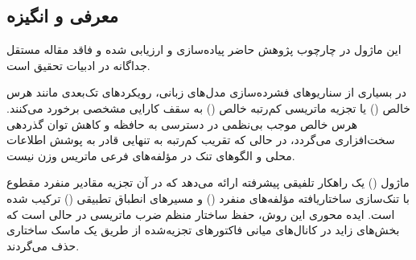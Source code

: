 \subsection{معرفی و انگیزه}
این ماژول در چارچوب پژوهش حاضر پیاده‌سازی و ارزیابی شده و فاقد مقاله مستقل جداگانه در ادبیات تحقیق است.

در بسیاری از سناریوهای فشرده‌سازی مدل‌های زبانی، رویکردهای تک‌بعدی مانند هرس خالص () یا تجزیه ماتریسی کم‌رتبه خالص () به سقف کارایی مشخصی برخورد می‌کنند. هرس خالص موجب بی‌نظمی در دسترسی به حافظه و کاهش توان گذردهی سخت‌افزاری می‌گردد، در حالی که تقریب کم‌رتبه به تنهایی قادر به پوشش اطلاعات محلی و الگوهای تنک در مؤلفه‌های فرعی ماتریس وزن نیست.

ماژول  () یک راهکار تلفیقی پیشرفته ارائه می‌دهد که در آن تجزیه مقادیر منفرد مقطوع با تنک‌سازی ساختاریافته مؤلفه‌های منفرد () و مسیرهای انطباق تطبیقی () ترکیب شده است. ایده محوری این روش، حفظ ساختار منظم ضرب ماتریسی در حالی است که بخش‌های زاید در کانال‌های میانی فاکتورهای تجزیه‌شده از طریق یک ماسک ساختاری حذف می‌گردند.
